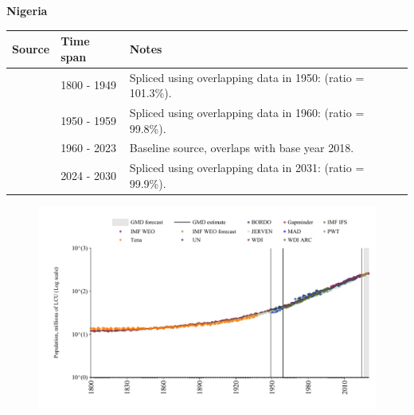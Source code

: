 \documentclass[12pt,a4paper,landscape]{article}
\begin{document}
\begin{adjustbox}{max totalsize={\paperwidth}{\paperheight},center}
\begin{minipage}[t][\textheight][t]{\textwidth}
\vspace*{0.5cm}
{}
\begin{center}
{\Large\bfseries Nigeria}
\end{center}
\vspace{0.5cm}
\begin{table}[H]
\centering
\small
\begin{tabular}{|l|l|l|}
\hline
\textbf{Source} & \textbf{Time span} & \textbf{Notes} \\
\hline
\rowcolor{white}\cite{Gapminder}& 1800 - 1949 &Spliced using overlapping data in 1950: (ratio = 101.3\%).\\
\rowcolor{lightgray}\cite{IMF_IFS}& 1950 - 1959 &Spliced using overlapping data in 1960: (ratio = 99.8\%).\\
\rowcolor{white}\cite{WDI}& 1960 - 2023 &Baseline source, overlaps with base year 2018.\\
\rowcolor{lightgray}\cite{Gapminder}& 2024 - 2030 &Spliced using overlapping data in 2031: (ratio = 99.9\%).\\
\hline
\end{tabular}
\end{table}
\begin{figure}[H]
\centering
\includegraphics[width=\textwidth,height=0.6\textheight,keepaspectratio]{graphs/NGA_pop.pdf}
\end{figure}
\end{minipage}
\end{adjustbox}
\end{document}
